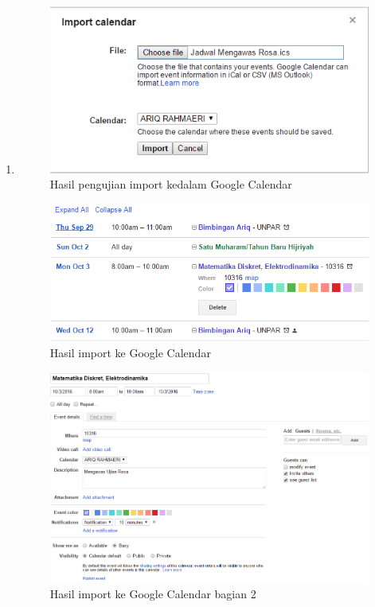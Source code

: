 \begin{enumerate}
	\item 
		\begin{figure}[H]
		\centering
		\includegraphics[scale=0.8]{Gambar/importGCEksperimental}
		\caption{Hasil pengujian import kedalam Google Calendar}
		\label{fig:importGC}
		\end{figure}
		
		\begin{figure}[H]
		\centering
		\includegraphics[scale=0.7]{Gambar/hasilGCEksperimental}
		\caption{Hasil import ke Google Calendar}
		\label{fig:hasilGCEksperimental}
		\end{figure}
		
		\begin{figure}[H]
		\centering
		\includegraphics[scale=0.5]{Gambar/hasilGCEksperimental2}
		\caption{Hasil import ke Google Calendar bagian 2 }
		\label{fig:hasilGCEksperimental2}
		\end{figure}
		

\end{enumerate}
